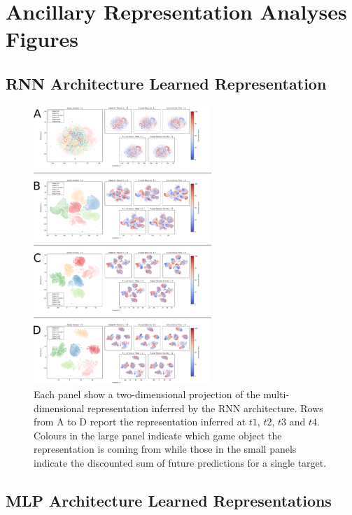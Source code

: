 \chapter{Ancillary Representation Analyses Figures}

\section{RNN Architecture Learned Representation}
\label{rnn_architecture_representations}

\begin{figure}[!htb]
\includegraphics[width=0.6\textwidth]{images/appendix_D/rnn_beha_umap.png}
\centering
\caption[\textbf{Lower dimensional representation of the latent representations generated by the RNN architecture}]{Each panel show a two-dimensional projection of the multi-dimensional representation inferred by the RNN architecture. Rows from A to D report the representation inferred at $t1$, $t2$, $t3$ and $t4$. Colours in the large panel indicate which game object the representation is coming from while those in the small panels indicate the discounted sum of future predictions for a single target.}
\end{figure}
\FloatBarrier

\section{MLP Architecture Learned Representations}
\label{mlp_architecture_representations}

